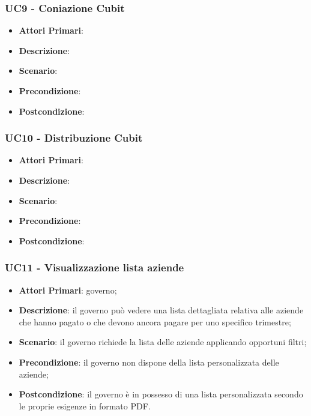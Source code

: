 \subsubsection{UC9 -  Coniazione Cubit}
\begin{itemize}
	\item \textbf{Attori Primari}:
	\item \textbf{Descrizione}:
	\item \textbf{Scenario}:
	\item \textbf{Precondizione}:
	\item \textbf{Postcondizione}:
\end{itemize}
\subsubsection{UC10 - Distribuzione Cubit}
\begin{itemize}
	\item \textbf{Attori Primari}:
	\item \textbf{Descrizione}:
	\item \textbf{Scenario}:
	\item \textbf{Precondizione}:
	\item \textbf{Postcondizione}:
\end{itemize}
\subsubsection{UC11 - Visualizzazione lista aziende}
\begin{itemize}
	\item \textbf{Attori Primari}: governo;
	\item \textbf{Descrizione}: il governo può vedere una lista dettagliata relativa alle aziende che hanno pagato o che devono ancora pagare per uno specifico trimestre;
	\item \textbf{Scenario}: il governo richiede la lista delle aziende applicando opportuni filtri;
	\item \textbf{Precondizione}: il governo non dispone della lista personalizzata delle aziende;
	\item \textbf{Postcondizione}: il governo è in possesso di una lista personalizzata secondo le proprie esigenze in formato PDF.
\end{itemize}
